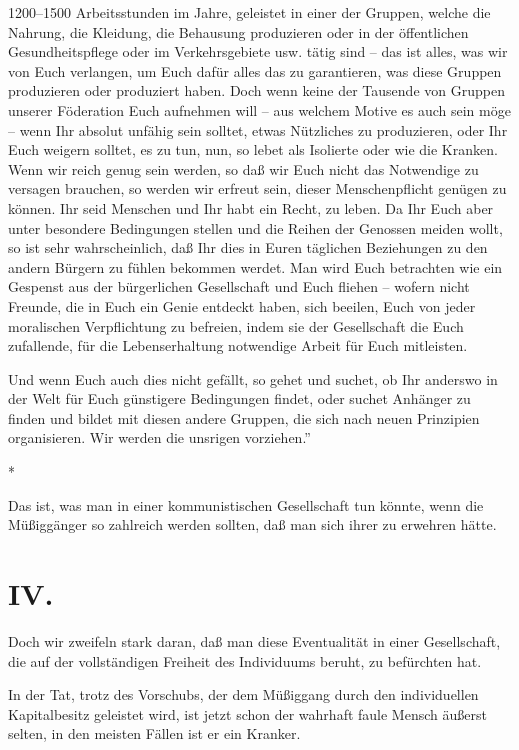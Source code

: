 \documentclass{scrbook}
\begin{document}
1200–1500 Arbeitsstunden im Jahre, geleistet in einer der Gruppen, welche die Nahrung, die Kleidung, die Behausung produzieren oder in der öffentlichen Gesundheitspflege oder im Verkehrsgebiete usw. tätig sind – das ist alles, was wir von Euch verlangen, um Euch dafür alles das zu garantieren, was diese Gruppen produzieren oder produziert haben. Doch wenn keine der Tausende von Gruppen unserer Föderation Euch aufnehmen will – aus welchem Motive es auch sein möge – wenn Ihr absolut unfähig sein solltet, etwas Nützliches zu produzieren, oder Ihr Euch weigern solltet, es zu tun, nun, so lebet als Isolierte oder wie die Kranken. Wenn wir reich genug sein werden, so daß wir Euch nicht das Notwendige zu versagen brauchen, so werden wir erfreut sein, dieser Menschenpflicht genügen zu können. Ihr seid Menschen und Ihr habt ein Recht, zu leben. Da Ihr Euch aber unter besondere Bedingungen stellen und die Reihen der Genossen meiden wollt, so ist sehr wahrscheinlich, daß Ihr dies in Euren täglichen Beziehungen zu den andern Bürgern zu fühlen bekommen werdet. Man wird Euch betrachten wie ein Gespenst aus der bürgerlichen Gesellschaft und Euch fliehen – wofern nicht Freunde, die in Euch ein Genie entdeckt haben, sich beeilen, Euch von jeder moralischen Verpflichtung zu befreien, indem sie der Gesellschaft die Euch zufallende, für die Lebenserhaltung notwendige Arbeit für Euch mitleisten.

Und wenn Euch auch dies nicht gefällt, so gehet und suchet, ob Ihr anderswo in der Welt für Euch günstigere Bedingungen findet, oder suchet Anhänger zu finden und bildet mit diesen andere Gruppen, die sich nach neuen Prinzipien organisieren. Wir werden die unsrigen vorziehen.''

\begin{center}*\end{center}

Das ist, was man in einer kommunistischen Gesellschaft tun könnte, wenn die Müßiggänger so zahlreich werden sollten, daß man sich ihrer zu erwehren hätte.

\section*{IV.}

Doch wir zweifeln stark daran, daß man diese Eventualität in einer Gesellschaft, die auf der vollständigen Freiheit des Individuums beruht, zu befürchten hat.

In der Tat, trotz des Vorschubs, der dem Müßiggang durch den individuellen Kapitalbesitz geleistet wird, ist jetzt schon der wahrhaft faule Mensch äußerst selten, in den meisten Fällen ist er ein Kranker.
\end{document}
